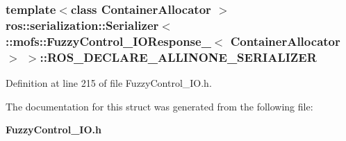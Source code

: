 \subsubsection[{R\-O\-S\-\_\-\-D\-E\-C\-L\-A\-R\-E\-\_\-\-A\-L\-L\-I\-N\-O\-N\-E\-\_\-\-S\-E\-R\-I\-A\-L\-I\-Z\-E\-R}]{\setlength{\rightskip}{0pt plus 5cm}template$<$class Container\-Allocator $>$ ros\-::serialization\-::\-Serializer$<$ \-::{\bf mofs\-::\-Fuzzy\-Control\-\_\-\-I\-O\-Response\-\_\-}$<$ Container\-Allocator $>$ $>$\-::R\-O\-S\-\_\-\-D\-E\-C\-L\-A\-R\-E\-\_\-\-A\-L\-L\-I\-N\-O\-N\-E\-\_\-\-S\-E\-R\-I\-A\-L\-I\-Z\-E\-R}\label{structros_1_1serialization_1_1Serializer_3_01_1_1mofs_1_1FuzzyControl__IOResponse___3_01ContainerAllocator_01_4_01_4_a9a96858473696efb88ca82eb88eef659}


Definition at line 215 of file Fuzzy\-Control\-\_\-\-I\-O.\-h.



The documentation for this struct was generated from the following file\-:\begin{DoxyCompactItemize}
\item 
{\bf Fuzzy\-Control\-\_\-\-I\-O.\-h}\end{DoxyCompactItemize}
